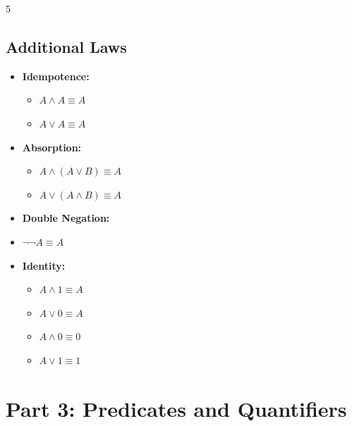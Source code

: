 \documentclass[a4paper,landscape]{article}
\begin{document}
\begin{multicols*}{5}
\subsection*{Additional Laws}
\begin{itemize}[leftmargin=*, itemsep=0pt]
    \item \textbf{Idempotence:}
    \begin{itemize}[leftmargin=*, itemsep=0pt]
        \item $A \wedge A \equiv A$
        \item $A \vee A \equiv A$
    \end{itemize}
    \item \textbf{Absorption:}
    \begin{itemize}[leftmargin=*, itemsep=0pt]
        \item $A \wedge (A \vee B) \equiv A$
        \item $A \vee (A \wedge B) \equiv A$
    \end{itemize}
    \item \textbf{Double Negation:}
        \item $\neg\neg A \equiv A$
    \item \textbf{Identity:}
    \begin{itemize}[leftmargin=*, itemsep=0pt]
        \item $A \wedge 1 \equiv A$
        \item $A \vee 0 \equiv A$
        \item $A \wedge 0 \equiv 0$
        \item $A \vee 1 \equiv 1$
    \end{itemize}
\end{itemize}

\section*{Part 3: Predicates and Quantifiers}


\end{multicols*}
\end{document}
